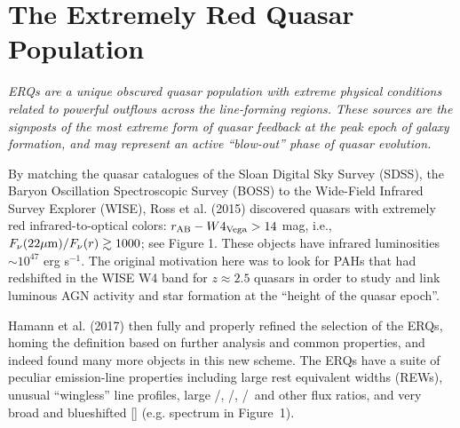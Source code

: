\section*{The Extremely Red Quasar Population} 
{\it ERQs are a unique obscured quasar population with extreme
physical conditions related to powerful outflows across the
line-forming regions. These sources are the signposts of the most
extreme form of quasar feedback at the peak epoch of galaxy formation,
and may represent an active ``blow-out'' phase of quasar evolution.  }

\smallskip
\smallskip
\noindent
By matching the quasar catalogues of the Sloan Digital Sky Survey
(SDSS), the Baryon Oscillation Spectroscopic Survey (BOSS) to the
Wide-Field Infrared Survey Explorer (WISE), Ross et al. (2015)
discovered quasars with extremely red infrared-to-optical colors:
$r_{\rm AB}-W4_{\rm Vega}>14$ mag, i.e., $F_\nu({\rm 22\mu
m})/F_\nu(r) \gtrsim 1000$; see Figure 1. These objects have infrared
luminosities $\sim 10^{47}$ erg s$^{-1}$.  The original motivation
here was to look for PAHs that had redshifted in the WISE W4 band for
$z\approx2.5$ quasars in order to study and link luminous AGN activity
and star formation at the ``height of the quasar epoch''.

\smallskip
\smallskip
\noindent
Hamann et al. (2017) then fully and properly refined the selection of
the ERQs, homing the definition based on further analysis and common
properties, and indeed found many more objects in this new scheme. The
ERQs have a suite of peculiar emission-line properties including large
rest equivalent widths (REWs), unusual ``wingless'' line profiles,
large \nv /\lya , \nv /\civ , \siiv /\civ\ and other flux ratios, and
very broad and blueshifted [\oiii ]  (e.g. spectrum in
Figure~1).


